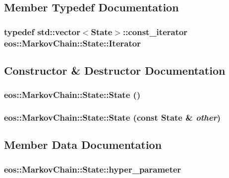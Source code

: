 \subsection{Member Typedef Documentation}
\hypertarget{structeos_1_1MarkovChain_1_1State_ad7590843e4feca7e696c53863e6e10c1}{
\subsubsection[{Iterator}]{\setlength{\rightskip}{0pt plus 5cm}typedef std::vector$<${\bf State}$>$::const\_\-iterator {\bf eos::MarkovChain::State::Iterator}}}
\label{structeos_1_1MarkovChain_1_1State_ad7590843e4feca7e696c53863e6e10c1}


\subsection{Constructor \& Destructor Documentation}
\hypertarget{structeos_1_1MarkovChain_1_1State_a93beca0dcab0389f5b822394f341afc6}{
\subsubsection[{State}]{\setlength{\rightskip}{0pt plus 5cm}eos::MarkovChain::State::State ()}}
\label{structeos_1_1MarkovChain_1_1State_a93beca0dcab0389f5b822394f341afc6}
\hypertarget{structeos_1_1MarkovChain_1_1State_adaf4e7d6c9fc2b02f8adb1e924ceaf3e}{
\subsubsection[{State}]{\setlength{\rightskip}{0pt plus 5cm}eos::MarkovChain::State::State (const {\bf State} \& {\em other})}}
\label{structeos_1_1MarkovChain_1_1State_adaf4e7d6c9fc2b02f8adb1e924ceaf3e}


\subsection{Member Data Documentation}
\hypertarget{structeos_1_1MarkovChain_1_1State_a23f1f4c2b99c7b8956409f5f645d0337}{
\subsubsection[{hyper\_\-parameter}]{ {\bf eos::MarkovChain::State::hyper\_\-parameter}}}
\label{structeos_1_1MarkovChain_1_1State_a23f1f4c2b99c7b8956409f5f645d0337}


